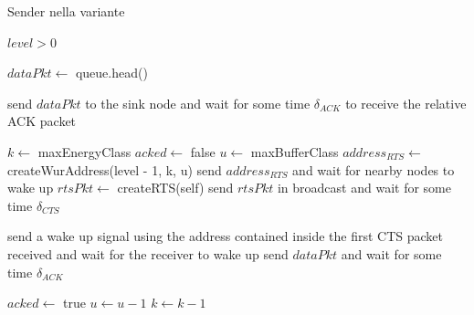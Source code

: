 \documentclass[binding=0.6cm,TFA]{sapthesis}
\begin{document}
\begin{algorithm}
    \caption{Sender nella variante}
    \begin{algorithmic}
        \REQUIRE $level > 0$

            \STATE $dataPkt \leftarrow$ queue.head()

                \STATE send $dataPkt$ to the sink node and wait for some time $\delta_{ACK}$ to receive the relative ACK packet

            \ELSE
                \STATE $k \leftarrow$ maxEnergyClass
                \STATE $acked \leftarrow$ false
                    \STATE $u \leftarrow$ maxBufferClass
                        \STATE $address_{RTS} \leftarrow$ createWurAddress(level - 1, k, u)
                        \STATE send $address_{RTS}$ and wait for nearby nodes to wake up
                        \STATE $rtsPkt \leftarrow$ createRTS(self)
                        \STATE send $rtsPkt$ in broadcast and wait for some time $\delta_{CTS}$
                        
                            \STATE send a wake up signal using the address contained inside the first CTS packet received and wait for the receiver to wake up
                            \STATE send $dataPkt$ and wait for some time $\delta_{ACK}$

                                \STATE $acked \leftarrow$ true
                            \ENDIF
                        \ENDIF
                        \STATE $u \leftarrow u-1$
                    \ENDWHILE
                    \STATE $k \leftarrow k-1$
                \ENDWHILE
            \ENDIF
        
        \ENDWHILE
    \end{algorithmic}
\end{algorithm}
\end{document}
